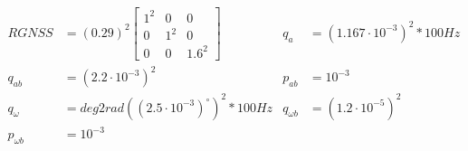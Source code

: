 \begin{align}
        RGNSS &= (0.29)^2\begin{bmatrix}
    1^2 & 0 & 0 \\
    0 & 1^2 & 0 \\
    0 & 0 & 1.6^2
\end{bmatrix} & q_a &= (1.167 \cdot 10^{-3})^2 * 100Hz \label{eq:eskf-sim-tuning1} \\
        q_{ab} &= (2.2 \cdot 10^{-3})^2 & p_{ab} &= 10^{-3} \label{eq:eskf-sim-tuning2} \\
        q_\omega &= deg2rad((2.5 \cdot 10^{-3})^\circ)^2 * 100Hz  & q_{\omega b} &= (1.2 \cdot 10^{-5})^2 \label{eq:eskf-sim-tuning3} \\
        p_{\omega b} &= 10^{-3} \label{eq:eskf-sim-tuning4}
\end{align}

